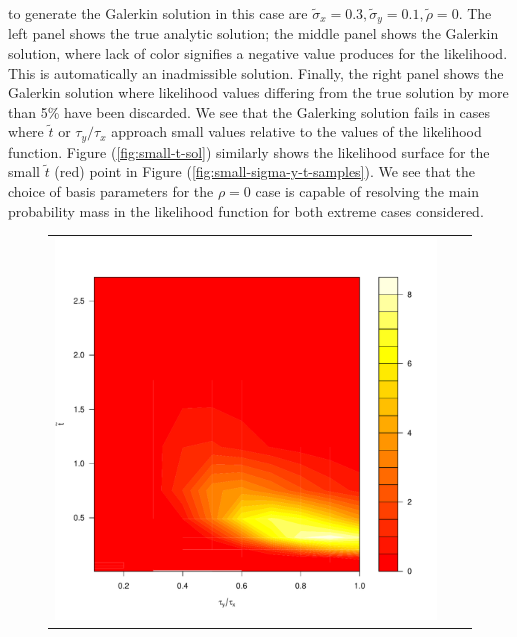 \documentclass[10pt]{article}
\begin{document}
\begin{enumerate}
to generate the Galerkin solution in this case are
$\tilde{\sigma}_x = 0.3, \tilde{\sigma}_y = 0.1, \tilde{\rho} =
0$. The left panel shows the true analytic solution; the middle panel
shows the Galerkin solution, where lack of color signifies a negative
value produces for the likelihood. This is automatically an
inadmissible solution. Finally, the right panel shows the Galerkin
solution where likelihood values differing from the true solution by
more than 5\% have been discarded. We see that the Galerking solution
fails in cases where $\tilde{t}$ or $\tau_y/\tau_x$ approach small
values relative to the values of the likelihood function. Figure
(\ref{fig:small-t-sol}) similarly shows the likelihood surface for the
small $\tilde{t}$ (red) point in Figure
(\ref{fig:small-sigma-y-t-samples}). We see that the choice of basis
parameters for the $\rho = 0$ case is capable of resolving the main
probability mass in the likelihood function for both extreme cases
considered.
\begin{figure}
  \centering
  \begin{tabular}{ccc}
    \begin{minipage}{0.33\textwidth}
      \centering
      \includegraphics[width=1\linewidth]{small-t-analytic.pdf}
    \end{minipage}
    & \begin{minipage}{0.33\textwidth}

\end{minipage}
\end{tabular}
\end{figure}
\end{enumerate}
\end{document}
